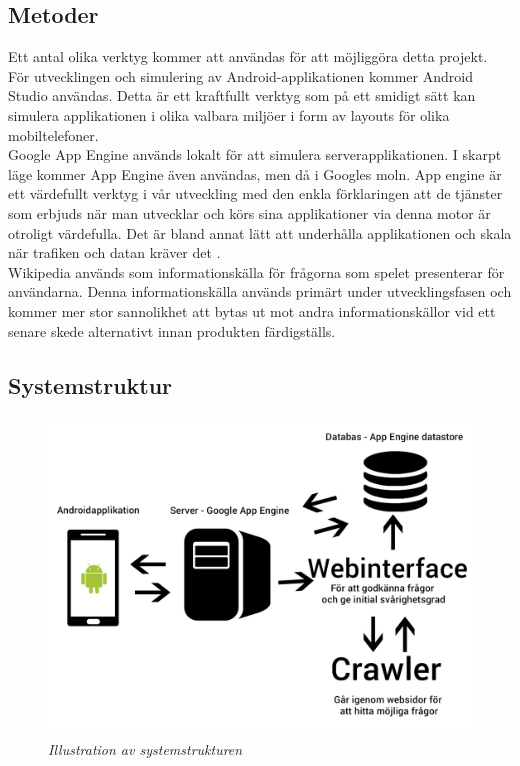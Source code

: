 \documentclass[12pt,a4paper]{article}
\begin{document}
\subsection{Metoder}
Ett antal olika verktyg kommer att användas för att möjliggöra detta projekt. För utvecklingen och simulering av Android-applikationen kommer Android Studio\cite{androidstudio} användas. Detta är ett kraftfullt verktyg som på ett smidigt sätt kan simulera applikationen i olika valbara miljöer i form av layouts för olika mobiltelefoner.\\
Google App Engine används lokalt för att simulera serverapplikationen. I skarpt läge kommer App Engine även användas, men då i Googles moln. App engine är ett värdefullt verktyg i vår utveckling med den enkla förklaringen att de tjänster som erbjuds när man utvecklar och körs sina applikationer via denna motor är otroligt värdefulla. Det är bland annat lätt att underhålla applikationen och skala när trafiken och datan kräver det \cite{googleappengine}.\\
Wikipedia används som informationskälla för frågorna som spelet presenterar för användarna. Denna informationskälla används primärt under utvecklingsfasen och kommer mer stor sannolikhet att bytas ut mot andra informationskällor vid ett senare skede alternativt innan produkten färdigställs.\\

\subsection{Systemstruktur}

\begin{figure}[H]
	\begin{centering}
	\includegraphics[width = \textwidth]{systemstruktur.jpg} 
	\end{centering}
	\caption{\textit{Illustration av systemstrukturen}}
\end{figure} 
\end{document}
